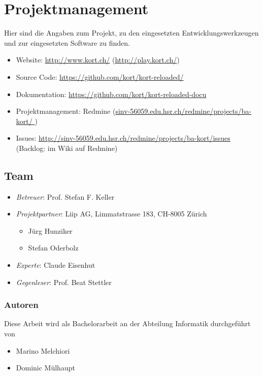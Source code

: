 \chapter{Projektmanagement}
\label{pm-projektmanagement}
Hier sind die Angaben zum Projekt, zu den eingesetzten Entwicklungswerkzeugen und zur eingesetzten Software zu finden.

\begin{itemize}
    \item Website: \url{http://www.kort.ch/} (\url{http://play.kort.ch/})
    \item Source Code: \url{https://github.com/kort/kort-reloaded/}
    \item Dokumentation: \url{https://github.com/kort/kort-reloaded-docu}
    \item Projektmanagement: Redmine (\url{sinv-56059.edu.hsr.ch/redmine/projects/ba-kort/ })
    \item Issues: \url{http://sinv-56059.edu.hsr.ch/redmine/projects/ba-kort/issues}  (Backlog: im Wiki auf Redmine) 
\end{itemize}

\section{Team}
\label{pm-team}
\begin{itemize}
	\item \textit{Betreuer}: Prof. Stefan F. Keller
	\item \textit{Projektpartner}: Liip AG, Limmatstrasse 183, CH-8005 Zürich
	\begin{itemize}
		\item Jürg Hunziker
		\item Stefan Oderbolz
	\end{itemize}
	\item \textit{Experte}: Claude Eisenhut
	\item \textit{Gegenleser}: Prof. Beat Stettler
\end{itemize}

\subsection*{Autoren}
\label{pm-team-autoren}
Diese Arbeit wird als Bachelorarbeit an der Abteilung Informatik durchgeführt von
\begin{itemize}
	\item Marino Melchiori
	\item Dominic Mülhaupt
\end{itemize}

